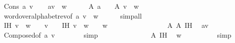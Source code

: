 \begin{isabellebody}
\ {\isacharparenleft}{\kern0pt}Cons\ a\ v{\isacharparenright}{\kern0pt}\isanewline
\ \ \isamarkupfalse%
\ {\isachardoublequoteopen}a{\isacharhash}{\kern0pt}v\ {\isasymsqdot}\ w\ {\isasymin}\ {\isasymSigma}\isactrlsup {\isacharasterisk}{\kern0pt}{\isachardoublequoteclose}\isanewline
\ \ \isamarkupfalse%
\ A{}{\isacharcolon}{\kern0pt}\ {\isachardoublequoteopen}a\ {\isasymin}\ {\isasymSigma}{\isachardoublequoteclose}\ \ A{}{\isacharcolon}{\kern0pt}\ {\isachardoublequoteopen}v\ {\isasymsqdot}\ w\ {\isasymin}\ {\isasymSigma}\isactrlsup {\isacharasterisk}{\kern0pt}{\isachardoublequoteclose}\isanewline
\ \ \ \ \isamarkupfalse%
\ word{\isacharunderscore}{\kern0pt}over{\isacharunderscore}{\kern0pt}alphabet{\isacharunderscore}{\kern0pt}rev{\isacharbrackleft}{\kern0pt}of\ a\ {\isachardoublequoteopen}v\ {\isasymsqdot}\ w{\isachardoublequoteclose}{\isacharbrackright}{\kern0pt}\isanewline
\ \ \ \ \isamarkupfalse%
\ simp{\isacharunderscore}{\kern0pt}all\isanewline
\ \ \isamarkupfalse%
\ IH{}{\isacharcolon}{\kern0pt}\ {\isachardoublequoteopen}v\ {\isasymsqdot}\ w\ {\isasymin}\ {\isasymSigma}\isactrlsup {\isacharasterisk}{\kern0pt}\ {\isasymLongrightarrow}\ v\ {\isasymin}\ {\isasymSigma}\isactrlsup {\isacharasterisk}{\kern0pt}{\isachardoublequoteclose}\ \ IH{}{\isacharcolon}{\kern0pt}\ {\isachardoublequoteopen}v\ {\isasymsqdot}\ w\ {\isasymin}\ {\isasymSigma}\isactrlsup {\isacharasterisk}{\kern0pt}\ {\isasymLongrightarrow}\ w\ {\isasymin}\ {\isasymSigma}\isactrlsup {\isacharasterisk}{\kern0pt}{\isachardoublequoteclose}\isanewline
\ \ \isakeywordONE{{\isacharbraceleft}{\kern0pt}}\isamarkupfalse%
\isanewline
\ \ \ \ \isamarkupfalse%
\ {}\isanewline
\ \ \ \ \isamarkupfalse%
\ A{}\ A{}\ IH{}\ \isamarkupfalse%
\ {\isachardoublequoteopen}a{\isacharhash}{\kern0pt}v\ {\isasymin}\ {\isasymSigma}\isactrlsup {\isacharasterisk}{\kern0pt}{\isachardoublequoteclose}\isanewline
\ \ \ \ \ \ \isamarkupfalse%
\ Composed{\isacharbrackleft}{\kern0pt}of\ a\ v{\isacharbrackright}{\kern0pt}\isanewline
\ \ \ \ \ \ \isamarkupfalse%
\ simp\isanewline
\ \ \isamarkupfalse%
\isanewline
\ \ \ \ \isamarkupfalse%
\ {}\isanewline
\ \ \ \ \isamarkupfalse%
\ A{}\ IH{}\ \isamarkupfalse%
\ {\isachardoublequoteopen}w\ {\isasymin}\ {\isasymSigma}\isactrlsup {\isacharasterisk}{\kern0pt}{\isachardoublequoteclose}\isanewline
\ \ \ \ \ \ \isamarkupfalse%
\ simp\isanewline
\ \ \isakeywordONE{{\isacharbraceright}{\kern0pt}}\isamarkupfalse%
\isanewline
{}\isamarkupfalse%
%
\endisatagproof
{\isafoldproof}%
%
\isadelimproof
\isanewline
%
\endisadelimproof
\isanewline
{}\isamarkupfalse%
\isanewline
%
\isadelimtheory
%
\endisadelimtheory
%
\isatagtheory
{}\isamarkupfalse%
%
\endisatagtheory
{\isafoldtheory}%
%
\isadelimtheory
%
\endisadelimtheory
%
\end{isabellebody}%
